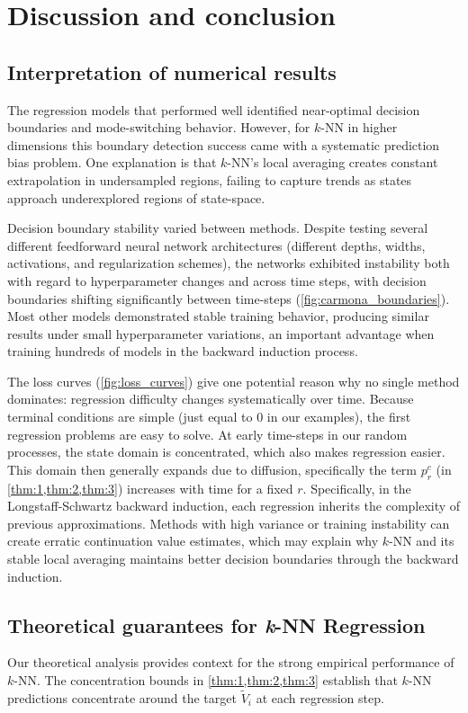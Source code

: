 \documentclass[11pt,reqno,a4paper]{amsart}
\theoremstyle{definition}
\numberwithin{equation}{section}
\DeclareMathOperator{\1}{\mathbbm{1}}
\begin{document}
\section{Discussion and conclusion}\label{sec:discussion}
\subsection{Interpretation of numerical results}
The regression models that performed well identified near-optimal decision boundaries and mode-switching behavior. However, for $k$-NN in higher dimensions this boundary detection success came with a systematic prediction bias problem. One explanation is that $k$-NN's local averaging creates constant extrapolation in undersampled regions, failing to capture trends as states approach underexplored regions of state-space.

Decision boundary stability varied between methods. Despite testing several different feedforward neural network architectures (different depths, widths, activations, and regularization schemes), the networks exhibited instability both with regard to hyperparameter changes and across time steps, with decision boundaries shifting significantly between time-steps (\cref{fig:carmona_boundaries}). Most other models demonstrated stable training behavior, producing similar results under small hyperparameter variations, an important advantage when training hundreds of models in the backward induction process.

The loss curves (\cref{fig:loss_curves}) give one potential reason why no single method dominates: regression difficulty changes systematically over time. Because terminal conditions are simple (just equal to 0 in our examples), the first regression problems are easy to solve. At early time-steps in our random processes, the state domain is concentrated, which also makes regression easier. This domain then generally expands due to diffusion, specifically the term $p^c_r$ (in \cref{thm:1,thm:2,thm:3}) increases with time for a fixed $r$. Specifically, in the Longstaff-Schwartz backward induction, each regression inherits the complexity of previous approximations. Methods with high variance or training instability can create erratic continuation value estimates, which may explain why $k$-NN and its stable local averaging maintains better decision boundaries through the backward induction.
\subsection{Theoretical guarantees for \textit{k}-NN Regression}
Our theoretical analysis provides context for the strong empirical performance of $k$-NN. The concentration bounds in \cref{thm:1,thm:2,thm:3} establish that $k$-NN predictions concentrate around the target $\widetilde V_i$ at each regression step. 
\end{document}
